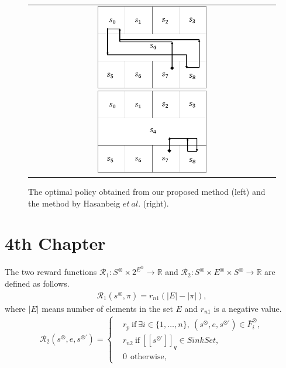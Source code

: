 \documentclass[a4j,12pt,oneside,openany,english,dvipdfmx]{jsbook}
\newcommand{\myspdq}{\ensuremath{[\![s^{\otimes \prime}]\!]}_q}
\begin{document}
\begin{figure}[tbp]
	\centering
	\begin{tabular}{c}

		\begin{minipage}{0.499\hsize}
			\includegraphics[bb=0 0 341 256, height = 3.7cm, width=5.5cm]{proposed_policy.png}
		\end{minipage}

		\begin{minipage}{0.499\hsize}
			\centering
			\includegraphics[bb=0 0 341 257, height = 3.7cm, width=5.5cm]{Abate_policy.png}
		\end{minipage}
	\end{tabular}

	\caption{The optimal policy obtained from our proposed method (left) and the method by Hasanbeig $et\ al.$\cite{HAK2019} (right).}
	\label{optimal}
\end{figure}

\chapter{4th Chapter}


\begin{definition}
  The two reward functions $\mathcal{R}_1 : S^{\otimes} \times 2^{E^{\otimes}} \rightarrow \mathbb{R}$ and $\mathcal{R}_2 : S^{\otimes} \times E^{\otimes} \times S^{\otimes} \rightarrow \mathbb{R}$ are defined as follows.
  \begin{align}
    \mathcal{R}_1 (s^{\otimes}, \pi) = r_{n1} (|E|-|\pi|),
  \end{align}
  where $|E|$ means number of elements in the set $E$ and $r_{n1}$ is a negative value.
  \begin{align}
    \mathcal{R}_2(s^{\otimes}, e, s^{\otimes \prime}) =
    \left\{
    \begin{aligned}
      &r_p \  \text{if}\ \exists i \in \! \{ 1, \ldots ,n \},\ (s^{\otimes}, e, s^{\otimes \prime}) \in \bar{F}^{\otimes}_i \!,\\
      &r_{n2} \ \text{if}\ \myspdq \in SinkSet,\\
      &0   \ \ \text{otherwise},
    \end{aligned}
    \right.
  \end{align}
\end{definition}
\end{document}
